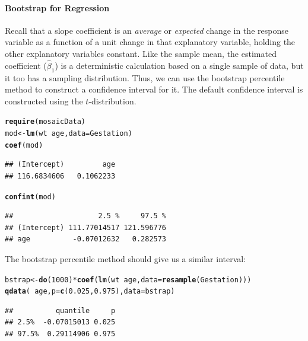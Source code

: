 \documentclass[10pt]{article}\usepackage[]{graphicx}\usepackage[]{color}
\makeatletter
\newcommand{\hlnum}[1]{\textcolor[rgb]{0.686,0.059,0.569}{#1}}%
\newcommand{\hlopt}[1]{\textcolor[rgb]{0,0,0}{#1}}%
\newcommand{\hlstd}[1]{\textcolor[rgb]{0.345,0.345,0.345}{#1}}%
\newcommand{\hlkwb}[1]{\textcolor[rgb]{0.69,0.353,0.396}{#1}}%
\newcommand{\hlkwc}[1]{\textcolor[rgb]{0.333,0.667,0.333}{#1}}%
\newcommand{\hlkwd}[1]{\textcolor[rgb]{0.737,0.353,0.396}{\textbf{#1}}}%
\newenvironment{kframe}{%
 \def\at@end@of@kframe{}%
 \ifinner\ifhmode%
  \def\at@end@of@kframe{\end{minipage}}%
  \begin{minipage}{\columnwidth}%
 \fi\fi%
 \def\FrameCommand##1{\hskip\@totalleftmargin \hskip-\fboxsep
 \colorbox{shadecolor}{##1}\hskip-\fboxsep
     \hskip-\linewidth \hskip-\@totalleftmargin \hskip\columnwidth}%
 \MakeFramed {\advance\hsize-\width
   \@totalleftmargin\z@ \linewidth\hsize
   \@setminipage}}%
 {\par\unskip\endMakeFramed%
 \at@end@of@kframe}
\newenvironment{knitrout}{}{} %
\makeatother
\begin{document}
\paragraph{Bootstrap for Regression}

Recall that a slope coefficient is an \emph{average} or \emph{expected} change in the response variable as a function of a unit change in that explanatory variable, holding the other explanatory variables constant. Like the sample mean, the estimated coefficient ($\hat{\beta}_1$) is a deterministic calculation based on a single sample of data, but it too has a sampling distribution. Thus, we can use the bootstrap percentile method to construct a confidence interval for it. The default confidence interval is constructed using the $t$-distribution.

\begin{knitrout}\footnotesize
{}\color{fgcolor}\begin{kframe}
\begin{alltt}
\hlkwd{require}\hlstd{(mosaicData)}
\hlstd{mod} \hlkwb{<-} \hlkwd{lm}\hlstd{(wt} \hlopt{~} \hlstd{age,} \hlkwc{data}\hlstd{=Gestation)}
\hlkwd{coef}\hlstd{(mod)}
\end{alltt}
\begin{verbatim}
## (Intercept)         age 
## 116.6834606   0.1062233
\end{verbatim}
\begin{alltt}
\hlkwd{confint}\hlstd{(mod)}
\end{alltt}
\begin{verbatim}
##                    2.5 %     97.5 %
## (Intercept) 111.77014517 121.596776
## age          -0.07012632   0.282573
\end{verbatim}
\end{kframe}
\end{knitrout}

The bootstrap percentile method should give us a similar interval:

\begin{knitrout}\footnotesize
{}\color{fgcolor}\begin{kframe}
\begin{alltt}
\hlstd{bstrap} \hlkwb{<-} \hlkwd{do}\hlstd{(}\hlnum{1000}\hlstd{)} \hlopt{*} \hlkwd{coef}\hlstd{(}\hlkwd{lm}\hlstd{(wt} \hlopt{~} \hlstd{age,} \hlkwc{data} \hlstd{=} \hlkwd{resample}\hlstd{(Gestation)))}
\hlkwd{qdata}\hlstd{(}\hlopt{~}\hlstd{age,} \hlkwc{p} \hlstd{=} \hlkwd{c}\hlstd{(}\hlnum{0.025}\hlstd{,} \hlnum{0.975}\hlstd{),} \hlkwc{data} \hlstd{= bstrap)}
\end{alltt}
\begin{verbatim}
##          quantile     p
## 2.5%  -0.07015013 0.025
## 97.5%  0.29114906 0.975
\end{verbatim}
\end{kframe}
\end{knitrout}

% 
% 
\end{document}
